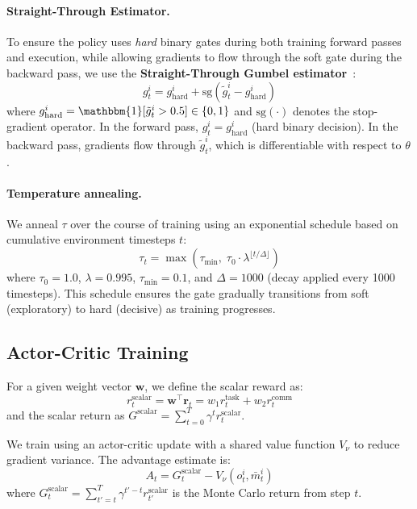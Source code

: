 \documentclass[runningheads]{llncs}
\newcommand{\sg}{\mathrm{sg}}
\newcommand{\bw}{\mathbf{w}}
\newcommand{\br}{\mathbf{r}}
\begin{document}
\paragraph{Straight-Through Estimator.}
To ensure the policy uses \emph{hard} binary gates during both training
forward passes and execution, while allowing gradients to flow through
the soft gate during the backward pass, we use the
\textbf{Straight-Through Gumbel estimator}~\cite{jang2017categorical}:
\begin{equation}
  g^i_t = g^i_\text{hard} + \sg(\tilde{g}^i_t - g^i_\text{hard})
  \label{eq:st_estimator}
\end{equation}
where $g^i_\text{hard} = \mathbbm{1}[\tilde{g}^i_t > 0.5] \in \{0,1\}$
and $\sg(\cdot)$ denotes the stop-gradient operator.
In the forward pass, $g^i_t = g^i_\text{hard}$ (hard binary decision).
In the backward pass, gradients flow through $\tilde{g}^i_t$, which is
differentiable with respect to $\theta$.

\paragraph{Temperature annealing.}
We anneal $\tau$ over the course of training using an exponential
schedule based on cumulative environment timesteps $t$:
\begin{equation}
  \tau_t = \max(\tau_\text{min},\; \tau_0 \cdot \lambda^{\lfloor t / \Delta \rfloor})
  \label{eq:annealing}
\end{equation}
where $\tau_0 = 1.0$, $\lambda = 0.995$, $\tau_\text{min} = 0.1$,
and $\Delta = 1000$ (decay applied every 1000 timesteps).
This schedule ensures the gate gradually transitions from soft
(exploratory) to hard (decisive) as training progresses.

\subsection{Actor-Critic Training}

For a given weight vector $\bw$, we define the scalar reward as:
\begin{equation}
  r^\text{scalar}_t = \bw^\top \br_t = w_1 r^\text{task}_t + w_2 r^\text{comm}_t
  \label{eq:scalar_reward}
\end{equation}
and the scalar return as $G^\text{scalar} = \sum_{t=0}^T \gamma^t r^\text{scalar}_t$.

We train using an actor-critic update with a shared value function
$V_\nu$ to reduce gradient variance.
The advantage estimate is:
\begin{equation}
  A_t = G^\text{scalar}_t - V_\nu(o^i_t, \bar{m}^i_t)
  \label{eq:advantage}
\end{equation}
where $G^\text{scalar}_t = \sum_{t'=t}^T \gamma^{t'-t} r^\text{scalar}_{t'}$
is the Monte Carlo return from step $t$.
\end{document}
